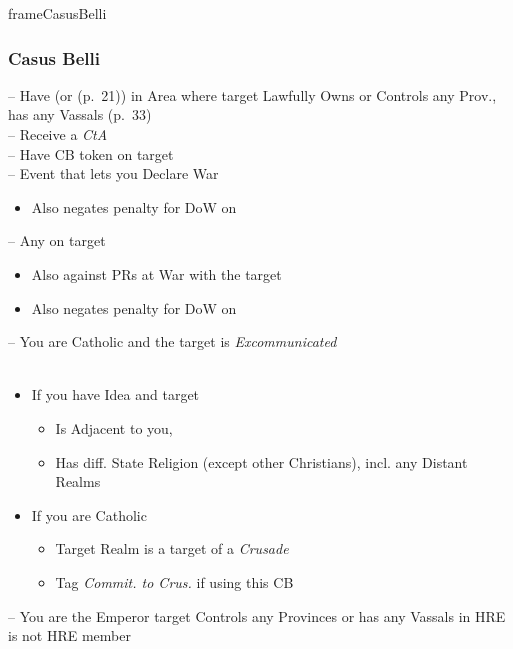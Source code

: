 \documentclass[10pt]{article}
\newlength{\fhCasusBelli} \setlength\fhCasusBelli{24\baselineskip}
\begin{document}
\begin{dynamiccontents*}{frameCasusBelli}\begin{eubox}{\fhCasusBelli}
	\subsubsection*{Casus Belli }
	 -- Have \claim (or \core (p.~21)) in Area where target Lawfully Owns or Controls any Prov.,  has any Vassals (p.~33)\\
	 -- Receive a \emph{CtA}\\
	 -- Have CB token on target\\
	 -- Event that lets you Declare War\\
	\begin{itemize}
		\item {}Also negates penalty for DoW on \marriage
	\end{itemize}
	 -- Any \disputedsuccession on target\\
	\begin{itemize}
		\item Also against PRs at War with the target
		\item {}Also negates penalty for DoW on \marriage
	\end{itemize}
	 -- You are Catholic and the target is \emph{Excommunicated}\\
	\\
	\begin{itemize}
		\item If you have  Idea and target
		\begin{itemize}
			\item Is Adjacent to you, 
			\item Has diff. State Religion (except other Christians), incl. any Distant Realms
		\end{itemize}
		\item If you are Catholic
		\begin{itemize}
			\item Target Realm is a target of a \emph{Crusade}
			\item Tag \emph{Commit. to Crus.} if using this CB
		\end{itemize}
	\end{itemize}
	 -- You are the Emperor  target Controls any Provinces or has any Vassals in HRE  is not HRE member
\end{eubox}\end{dynamiccontents*}
\end{document}
